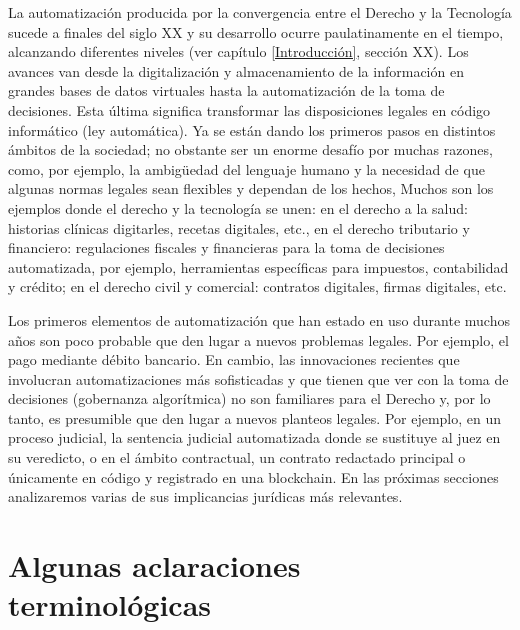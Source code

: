 \documentclass[12pt]{report} %
\begin{document}
La automatización producida por la convergencia entre el Derecho y la Tecnología sucede a finales del siglo XX y su desarrollo ocurre paulatinamente en el tiempo, alcanzando diferentes niveles (ver capítulo \ref{Introducción}, sección XX). Los avances van desde la digitalización y almacenamiento de la información en grandes bases de datos virtuales hasta la automatización de la toma de decisiones. Esta última significa transformar las disposiciones legales en código informático (ley automática). Ya se están dando los primeros pasos en distintos ámbitos de la sociedad; no obstante ser un enorme desafío por muchas razones, como, por ejemplo, la ambigüedad del lenguaje humano y la necesidad de que algunas normas legales sean flexibles y dependan de los hechos, Muchos son los ejemplos donde el derecho y la tecnología se unen: en el derecho a la salud: historias clínicas digitarles, recetas digitales, etc., en el derecho tributario y financiero: regulaciones fiscales y financieras para la toma de decisiones automatizada, por ejemplo, herramientas específicas para impuestos, contabilidad y crédito; en el derecho civil y comercial: contratos digitales, firmas digitales, etc. 

Los primeros elementos de automatización que han estado en uso durante muchos años son poco probable que den lugar a nuevos problemas legales. Por ejemplo, el pago mediante débito bancario. En cambio, las innovaciones recientes que involucran automatizaciones más sofisticadas y que tienen que ver con la toma de decisiones (gobernanza algorítmica) no son familiares para el Derecho y, por lo tanto, es presumible que den lugar a nuevos planteos legales. Por ejemplo, en un proceso judicial, la sentencia judicial automatizada donde se sustituye al juez en su veredicto, o en el ámbito contractual, un contrato redactado principal o únicamente en código y registrado en una blockchain. En las próximas secciones analizaremos varias de sus implicancias jurídicas más relevantes.

\section{Algunas aclaraciones terminológicas}
\end{document}
